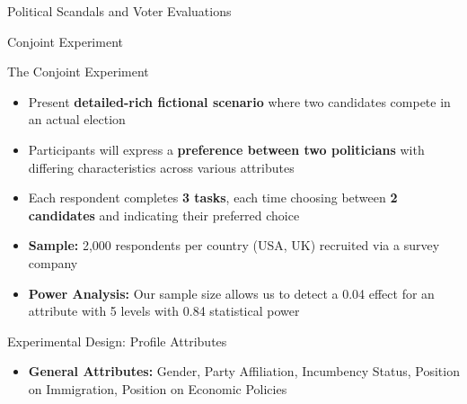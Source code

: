 \documentclass[9pt, aspectratio=169]{beamer}
\newcommand{\customcite}[1]{\textcolor{blue}{\footnotesize\parencite{#1}}}
\begin{document}
\begin{section} {Political Scandals and Voter Evaluations}
\begin{subsection}{Conjoint Experiment}
\begin{frame}{The Conjoint Experiment}
    \begin{itemize}
        \item Present \textbf{detailed-rich fictional scenario} where two candidates compete in an actual election \customcite{Galasso} \vspace{0.3cm}
        \item Participants will express a \textbf{preference between two politicians} with differing characteristics across various attributes \vspace{0.3cm}
        \item Each respondent completes \textbf{3 tasks}, each time choosing between \textbf{2 candidates} and indicating their preferred choice \vspace{0.3cm}
        \item \textbf{Sample:} 2,000 respondents per country (USA, UK) recruited via a survey company \vspace{0.3cm}
        \item \textbf{Power Analysis:} Our sample size allows us to detect a 0.04 effect for an attribute with 5 levels with 0.84 statistical power \customcite{lukac_stefanelli_2020}
    \end{itemize}
\end{frame}

\begin{frame}{Experimental Design: Profile Attributes}
\begin{itemize}
    \item \textbf{General Attributes:} Gender, Party Affiliation, Incumbency Status, Position on Immigration, Position on Economic Policies
\end{itemize}
\vspace{0.3cm}
\begin{table}[!h]
\centering
{}
\end{table}
\end{frame}
\end{subsection}
\end{section}
\end{document}
